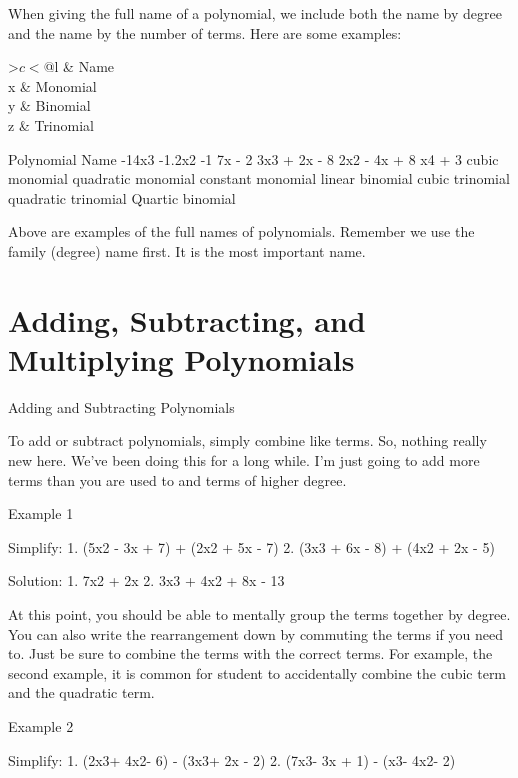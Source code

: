 When giving the full name of a polynomial, we include both the name by degree and the name by the number of terms. Here are some examples:

\begin{table}[!htbp]
\centering
\begin{tabular}{>$c<$@{\hspace{2em}}l}
		& Name\\\hline
x 						& Monomial\\
y 						& Binomial\\
z 						& Trinomial\\
\end{tabular}
\label{table:polynameex}
\caption{Examples of polynomial names.}
\end{table}




Polynomial
Name
-14x3
-1.2x2
-1
7x - 2
3x3 + 2x - 8
2x2 - 4x + 8
x4 + 3
cubic monomial
quadratic monomial
constant monomial
linear binomial
cubic trinomial
quadratic trinomial
Quartic binomial
 
Above are examples of the full names of polynomials. Remember we use the family (degree) name first. It is the most important name.

\section{Adding, Subtracting, and Multiplying Polynomials}

Adding and Subtracting Polynomials

To add or subtract polynomials, simply combine like terms. So, nothing really new here. We've been doing this for a long while. I'm just going to add more terms than you are used to and terms of higher degree.

Example 1

Simplify: 
1. (5x2 - 3x + 7) + (2x2 + 5x - 7)
2. (3x3 + 6x - 8) + (4x2 + 2x - 5)

Solution:
1. 7x2 + 2x
2. 3x3 + 4x2 + 8x - 13

At this point, you should be able to mentally group the terms together by degree. You can also write the rearrangement down by commuting the terms if you need to. Just be sure to combine the terms with the correct terms. For example, the second example, it is common for student to accidentally combine the cubic term and the quadratic term.

Example 2

Simplify: 
1. (2x3+ 4x2- 6) - (3x3+ 2x - 2)
2. (7x3- 3x + 1) - (x3- 4x2- 2)

